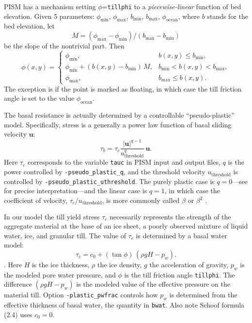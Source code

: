 PISM has a mechanism setting $\phi$=\texttt{tillphi} to a \emph{piecewise-linear} function of bed elevation.  Given 5 parameters: $\phi_{\mathrm{min}}$, $\phi_{\mathrm{max}}$, $b_{\mathrm{min}}$, $b_{\mathrm{max}}$, $\phi_{\mathrm{ocean}}$, where $b$ stands for the bed elevation, let 
\begin{equation}
  M = (\phi_{\text{max}} - \phi_{\text{min}}) / (b_{\text{max}} - b_{\text{min}})\label{eq:1}
\end{equation}
be the slope of the nontrivial part.  Then
\begin{equation}
  \phi(x,y) = \begin{cases}
    \phi_{\text{min}}, & b(x,y) \le b_{\text{min}}, \\
    \phi_{\text{min}} + (b(x,y) - b_{\text{min}}) \,M,
    &  b_{\text{min}} < b(x,y) < b_{\text{max}}, \\
    \phi_{\text{max}}, & b_{\text{max}} \le b(x,y). \end{cases}\label{eq:2}
\end{equation}
The exception is if the point is marked as floating, in which case the till friction angle
is set to the value $\phi_{\mathrm{ocean}}$.

The basal resistance is actually determined by a controllable ``pseudo-plastic'' model.  Specifically, stress is a generally a power law function of basal sliding velocity $\mathbf{u}$:
   $$\tau_b = \tau_c \frac{|\mathbf{u}|^{q-1}}{u_{\text{threshold}}^q}\, \mathbf{u}.$$
Here $\tau_c$ corresponds to the variable \texttt{tauc} in PISM input and output files, $q$ is the power controlled by \texttt{-pseudo_plastic_q}, and the threshold velocity $u_{\text{threshold}}$ is controlled by \texttt{-pseudo_plastic_uthreshold}.  The purely plastic case is $q=0$---see \cite{SchoofStream} for precise interpretation---and the linear case is $q=1$, in which case the coefficient of velocity, $\tau_c/u_{\text{threshold}}$, is more commonly called $\beta$ or $\beta^2$ \cite{MacAyeal}.

In our model the till yield stress $\tau_c$ necessarily represents the strength of the aggregate material at the base of an ice sheet, a poorly observed mixture of liquid water, ice, and granular till.  The value of $\tau_c$ is determined by a basal water model:
\begin{equation*}
   \tau_c = c_{0} + (\tan\phi)\,(\rho g H - p_w).
\end{equation*}
\cite[Chapter 8]{Paterson}.  Here $H$ is the ice thickness, $\rho$ the ice density, $g$ the acceleration of gravity, $p_w$ is the modeled pore water
pressure, and $\phi$ is the till friction angle \texttt{tillphi}.  The difference $(\rho g H - p_w)$ is the modeled value of the effective pressure on the material till.  Option \texttt{-plastic_pwfrac} controls how $p_w$ is determined from the effective thickness of basal water, the quantity in \texttt{bwat}. Also note Schoof \cite{SchoofStream} formula (2.4) uses $c_0 = 0$.

